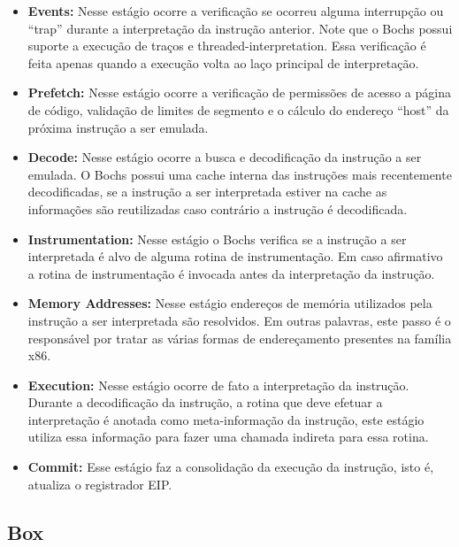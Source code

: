 \documentclass[11pt,twoside]{article}
\begin{document}
\begin{itemize}
	\item \textbf{Events:} Nesse estágio ocorre a verificação se ocorreu alguma
	interrupção ou ``trap'' durante a interpretação da instrução
	anterior. Note que o Bochs possui suporte a execução de traços e
	threaded-interpretation. Essa verificação é feita apenas quando
	a execução volta ao laço principal de interpretação.

	\item \textbf{Prefetch:} Nesse estágio ocorre a verificação de permissões 
	de acesso a página de código, validação de limites de segmento e 
	o cálculo do endereço ``host'' da próxima instrução a ser emulada.

	\item \textbf{Decode:} Nesse estágio ocorre a busca e decodificação da
	instrução a ser emulada. O Bochs possui uma cache interna das 
	instruções mais recentemente decodificadas, se a instrução a
	ser interpretada estiver na cache as informações são reutilizadas
	caso contrário a instrução é decodificada.

	\item \textbf{Instrumentation:} Nesse estágio o Bochs verifica se a
	instrução a ser interpretada é alvo de alguma rotina de 
	instrumentação. Em caso afirmativo a rotina de instrumentação é
	invocada antes da interpretação da instrução.

	\item \textbf{Memory Addresses:} Nesse estágio endereços de memória
	utilizados pela instrução a ser interpretada são resolvidos.
	Em outras palavras, este passo é o responsável por tratar as
	várias formas de endereçamento presentes na família x86.

	\item \textbf{Execution:} Nesse estágio ocorre de fato a interpretação 
	da instrução. Durante a decodificação da instrução, a rotina
	que deve efetuar a interpretação é anotada como meta-informação
	da instrução, este estágio utiliza essa informação para fazer
	uma chamada indireta para essa rotina.

	\item \textbf{Commit:} Esse estágio faz a consolidação da execução da
	instrução, isto é, atualiza o registrador EIP.

\end{itemize}


\subsection{Box}
\end{document}
